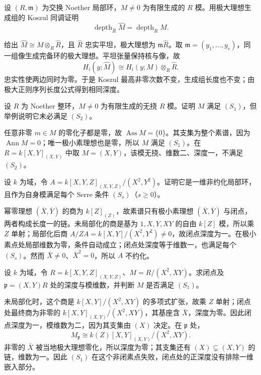 \begin{exercise}\label{b3:ex:16-completion-depth}
	设 \((R,\mathfrak m)\) 为交换 Noether 局部环，\(M\ne0\) 为有限生成的 \(R\) 模。用极大理想生成组的 Koszul 同调证明
	\[
		\operatorname{depth}_{\widehat R}\widehat M=\operatorname{depth}_RM.
	\]
\end{exercise}
\begin{solution}
	给出 \(\widehat M\cong M\otimes_R\widehat R\)，且 \(\widehat R\) 忠实平坦，极大理想为 \(\mathfrak m\widehat R\)。取 \(\mathfrak m=(y_1,\ldots,y_e)\)，同一组像生成完备环的极大理想。平坦张量保持核与像，故
	\[
		H_i(y;\widehat M)\cong H_i(y;M)\otimes_R\widehat R.
	\]
	忠实性使两边同时为零。于是 Koszul 最高非零次数不变，生成组长度也不变；由极大正则序列长度公式得到相同深度。
\end{solution}

\begin{exercise}\label{b3:ex:16-s1-torsion-free}
	设 \(R\) 为 Noether 整环，\(M\ne0\) 为有限生成的无挠 \(R\) 模。证明 \(M\) 满足 \((S_1)\)，但举例说明它未必满足 \((S_2)\)。
\end{exercise}
\begin{solution}
	任意非零 \(m\in M\) 的零化子都是零，故 \(\operatorname{Ass}M=\{0\}\)。其支集为整个素谱，因为 \(\operatorname{Ann}M=0\)；唯一极小素理想也是零，所以 \(M\) 满足 \((S_1)\)。在 \(R=k[X,Y]_{(X,Y)}\) 中取 \(M=(X,Y)\)，该模无挠、维数二、深度一，不满足 \((S_2)\)。
\end{solution}

\begin{exercise}\label{b3:ex:16-s1-not-reduced}
	设 \(k\) 为域，令 \(A=k[X,Y,Z]_{(X,Y,Z)}/(X^2,Y^2)\)。证明它是一维非约化局部环，且作为自身模满足每个 Serre 条件 \((S_s)\)（\(s\ge0\)）。
\end{exercise}
\begin{solution}
	幂零理想 \((\bar X,\bar Y)\) 的商为 \(k[Z]_{(Z)}\)，故素谱只有极小素理想 \((\bar X,\bar Y)\) 与闭点，两者构成长度一的链。未局部化的商是基为 \(1,X,Y,XY\) 的自由 \(k[Z]\) 模，所以乘 \(Z\) 单射；局部化后商 \(A/ZA=k[X,Y]/(X^2,Y^2)\ne0\)，故闭点深度为一。在极小素点处局部维数为零，条件自动成立；闭点处深度等于维数一，也满足每个 \((S_s)\)。然而 \(\bar X\ne0\)、\(\bar X^2=0\)，所以 \(A\) 不约化。
\end{solution}

\begin{exercise}\label{b3:ex:16-maximal-check-insufficient}
	设 \(k\) 为域，令 \(R=k[X,Y,Z]_{(X,Y,Z)}\)、\(M=R/(X^2,XY)\)。求闭点及 \(\mathfrak p=(X,Y)R\) 处的深度与模维数，并判断 \(M\) 是否满足 \((S_1)\)。
\end{exercise}
\begin{solution}
	未局部化时，这个商是 \(k[X,Y]/(X^2,XY)\) 的多项式扩张，故乘 \(Z\) 单射；闭点处最终商为非零的 \(k[X,Y]_{(X,Y)}/(X^2,XY)\)，其基座含 \(\bar X\)，深度为零。因此闭点深度为一，模维数为二，因为其支集由 \((X)\) 决定。在 \(\mathfrak p\) 处，
	\[
		M_{\mathfrak p}\cong k(Z)[X,Y]_{(X,Y)}/(X^2,XY).
	\]
	非零的 \(\bar X\) 被当地极大理想零化，所以深度为零；其支集还有 \((X)\subsetneq(X,Y)\) 的链，维数为一。因此 \((S_1)\) 在这个非闭素点失败，闭点处的正深度没有排除一维嵌入部分。
\end{solution}

